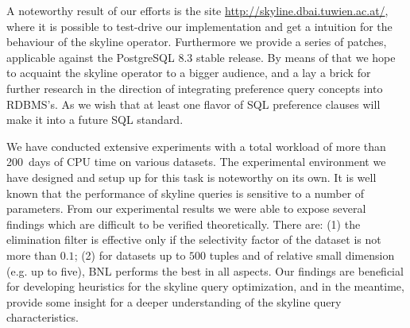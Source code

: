 A noteworthy result of our efforts is the site
\url{http://skyline.dbai.tuwien.ac.at/}, where it is possible to
test-drive our implementation and get a intuition for the behaviour of
the skyline operator.  Furthermore we provide a series of patches,
applicable against the PostgreSQL 8.3 stable release. By means of that
we hope to acquaint the skyline operator to a bigger audience, and a
lay a brick for further research in the direction of integrating
preference query concepts into RDBMS's.  As we wish that at least one
flavor of SQL preference clauses will make it into a future SQL
standard.

We have conducted extensive experiments with a total workload of 
more than 200~days of CPU time on various datasets.
The experimental environment we have designed and setup up for this
task is noteworthy on its own.
%
It is well known that the performance of skyline queries is sensitive
to a number of parameters.
%
From our experimental results we were able to expose several findings
which are difficult to be verified theoretically.  There are: (1) the
elimination filter is effective only if the selectivity factor of the
dataset is not more than $0.1$; (2) for datasets up to $500$ tuples
and of relative small dimension (e.g. up to five), BNL performs the
best in all aspects.
%
Our findings are beneficial for developing heuristics for the skyline
query optimization, and in the meantime, provide some insight for a
deeper understanding of the skyline query characteristics.



% 
% 
% 
% 
% 
% 
% 
% 
% 
% 
% 

